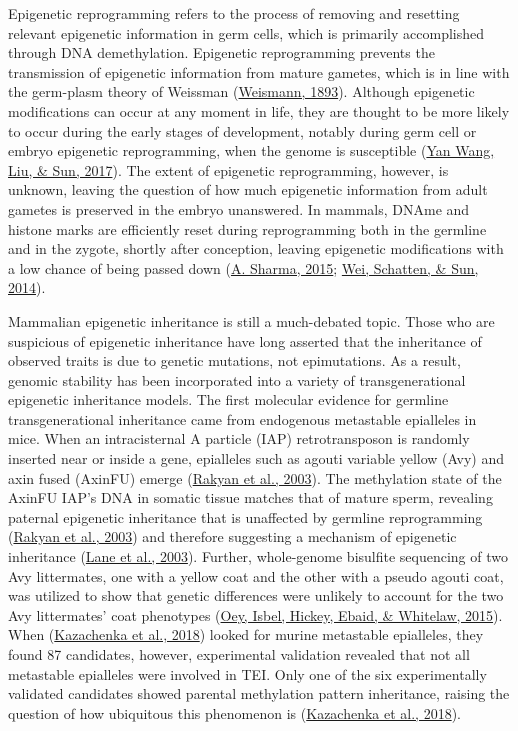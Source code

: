 \documentclass[12pt,twoside]{reedthesis}
\begin{document}
Epigenetic reprogramming refers to the process of removing and resetting
relevant epigenetic information in germ cells, which is primarily
accomplished through DNA demethylation. Epigenetic reprogramming
prevents the transmission of epigenetic information from mature gametes,
which is in line with the germ-plasm theory of Weissman (\protect\hyperlink{ref-weismann1893}{Weismann, 1893}).
Although epigenetic modifications can occur at any moment in life, they
are thought to be more likely to occur during the early stages of
development, notably during germ cell or embryo epigenetic
reprogramming, when the genome is susceptible (\protect\hyperlink{ref-wang2017}{Yan Wang, Liu, \& Sun, 2017}). The extent of
epigenetic reprogramming, however, is unknown, leaving the question of
how much epigenetic information from adult gametes is preserved in the
embryo unanswered. In mammals, DNAme and histone marks are efficiently
reset during reprogramming both in the germline and in the zygote,
shortly after conception, leaving epigenetic modifications with a low
chance of being passed down (\protect\hyperlink{ref-sharma2015}{A. Sharma, 2015}; \protect\hyperlink{ref-wei2014a}{Wei, Schatten, \& Sun, 2014}).

Mammalian epigenetic inheritance is still a much-debated topic. Those
who are suspicious of epigenetic inheritance have long asserted that the
inheritance of observed traits is due to genetic mutations, not
epimutations. As a result, genomic stability has been incorporated into
a variety of transgenerational epigenetic inheritance models. The first
molecular evidence for germline transgenerational inheritance came from
endogenous metastable epialleles in mice. When an intracisternal A
particle (IAP) retrotransposon is randomly inserted near or inside a
gene, epialleles such as agouti variable yellow (Avy) and axin fused
(AxinFU) emerge (\protect\hyperlink{ref-rakyan2003}{Rakyan et al., 2003}). The methylation state of the AxinFU IAP's
DNA in somatic tissue matches that of mature sperm, revealing paternal
epigenetic inheritance that is unaffected by germline reprogramming
(\protect\hyperlink{ref-rakyan2003}{Rakyan et al., 2003}) and therefore suggesting a mechanism of epigenetic
inheritance (\protect\hyperlink{ref-lane2003}{Lane et al., 2003}). Further, whole-genome bisulfite sequencing of
two Avy littermates, one with a yellow coat and the other with a pseudo
agouti coat, was utilized to show that genetic differences were unlikely
to account for the two Avy littermates' coat phenotypes (\protect\hyperlink{ref-oey2015}{Oey, Isbel, Hickey, Ebaid, \& Whitelaw, 2015}). When
(\protect\hyperlink{ref-kazachenka2018}{Kazachenka et al., 2018}) looked for murine metastable epialleles, they found 87
candidates, however, experimental validation revealed that not all
metastable epialleles were involved in TEI. Only one of the six
experimentally validated candidates showed parental methylation pattern
inheritance, raising the question of how ubiquitous this phenomenon is
(\protect\hyperlink{ref-kazachenka2018}{Kazachenka et al., 2018}).
\end{document}
